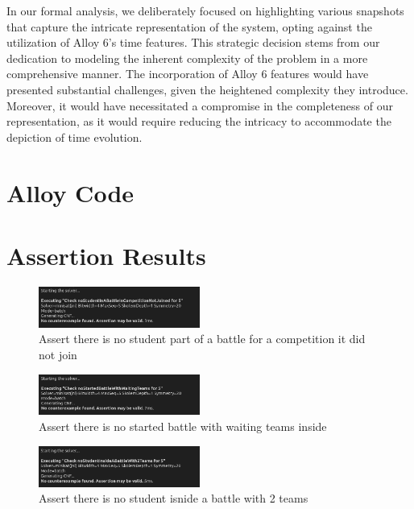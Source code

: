 In our formal analysis, we deliberately focused on highlighting various snapshots that capture the intricate representation of the system, opting against the utilization of Alloy 6's time features. This strategic decision stems from our dedication to modeling the inherent complexity of the problem in a more comprehensive manner. The incorporation of Alloy 6 features would have presented substantial challenges, given the heightened complexity they introduce. Moreover, it would have necessitated a compromise in the completeness of our representation, as it would require reducing the intricacy to accommodate the depiction of time evolution.

\section{Alloy Code}


\section{Assertion Results}

\begin{figure}[H]
    \centering
    \includegraphics[width=200px]{Images/alloy/assert_1.png}
    \caption{Assert there is no student part of a battle for a competition it did not join}
\end{figure}

\begin{figure}[H]
    \centering
    \includegraphics[width=200px]{Images/alloy/assert_2.png}
    \caption{Assert there is no started battle with waiting teams inside}
\end{figure}

\begin{figure}[H]
    \centering
    \includegraphics[width=200px]{Images/alloy/assert_3.png}
    \caption{Assert there is no student isnide a battle with 2 teams}
\end{figure}


